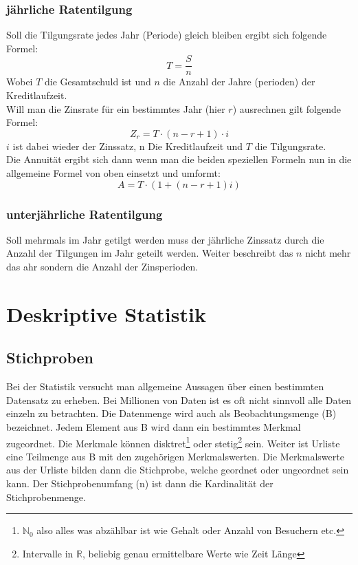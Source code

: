 \documentclass[a4paper]{scrartcl}
\begin{document}
            \subsubsection{jährliche Ratentilgung}
            Soll die Tilgungsrate jedes Jahr (Periode) gleich bleiben ergibt sich folgende Formel:
            \begin{equation*}
                T = \frac{S}{n}
            \end{equation*}
            Wobei \(T\) die Gesamtschuld ist und \(n\) die Anzahl der Jahre (perioden) der Kreditlaufzeit.\\
            Will man die Zinsrate für ein bestimmtes Jahr (hier \(r\)) ausrechnen gilt folgende Formel: 
            \begin{equation*}
                Z_r = T \cdot (n - r + 1) \cdot i
            \end{equation*} 
            \(i\) ist dabei wieder der Zinssatz, n Die Kreditlaufzeit und \(T\) die Tilgungsrate. \\
            Die Annuität ergibt sich dann wenn man die beiden speziellen Formeln nun in die allgemeine Formel von oben einsetzt und umformt: 
            \begin{equation*}
                A = T \cdot (1 + (n - r + 1)i)
            \end{equation*}

            \subsubsection{unterjährliche Ratentilgung}
            Soll mehrmals im Jahr getilgt werden muss der jährliche Zinssatz durch die Anzahl der Tilgungen im Jahr geteilt werden. Weiter beschreibt das \(n\) nicht mehr das ahr sondern die Anzahl
            der Zinsperioden.  
    \section{Deskriptive Statistik}
        \subsection{Stichproben}
            Bei der Statistik versucht man allgemeine Aussagen über einen bestimmten Datensatz zu erheben. Bei Millionen von Daten ist es oft nicht sinnvoll alle 
            Daten einzeln zu betrachten. Die Datenmenge wird auch als Beobachtungsmenge (B) bezeichnet. Jedem Element aus B wird dann ein bestimmtes Merkmal zugeordnet.
            Die Merkmale können disktret\footnote{\(\mathbb{N}_0\) also alles was abzählbar ist wie Gehalt oder Anzahl von Besuchern etc.} oder stetig\footnote{Intervalle in \(\mathbb{R}\), beliebig genau ermittelbare Werte
            wie Zeit Länge} sein. Weiter ist Urliste eine Teilmenge aus B mit den zugehörigen Merkmalswerten. Die Merkmalswerte aus der Urliste bilden dann die Stichprobe, welche 
            geordnet oder ungeordnet sein kann. Der Stichprobenumfang (n) ist dann die Kardinalität der Stichprobenmenge.
\end{document}
